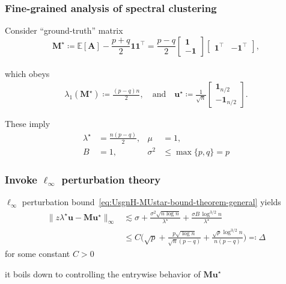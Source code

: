 \documentclass[compress,
mathserif,wide,%
]{beamer}
\begin{document}
\begin{frame}
\frametitle{Fine-grained analysis of spectral clustering}
Consider ``ground-truth'' matrix
\[
\bm{M}^{\star}\coloneqq\mathbb{E}[\bm{A}]-\frac{p+q}{2}\bm{1}\bm{1}^{\top}=\frac{p-q}{2}\left[\begin{array}{c}
\bm{1}\\
-\bm{1}
\end{array}\right]\left[\begin{array}{cc}
\bm{1}^{\top} & -\bm{1}^{\top}\end{array}\right], 
\] \\
which obeys 
\begin{align*}
	\lambda_{1}(\bm{M}^{\star})\coloneqq\frac{(p-q)n}{2},  
	\quad \text{and} \quad
	\bm{u}^{\star}  \coloneqq \frac{1}{\sqrt{n}}
	\left[\begin{array}{c}
		\bm{1}_{n/2}\\
		-\bm{1}_{n/2}
	\end{array}\right].
\end{align*}

	
These imply	\begin{align*}
\lambda^{\star} & =\tfrac{n(p-q)}{2}, & \mu & =1,\\
B & =1, & \sigma^{2} & \leq\max\{p,q\}=p
\end{align*}

\end{frame}

\begin{frame}
\frametitle{Invoke $\ell_{\infty}$ perturbation theory}
$\ell_{\infty}$ perturbation bound~\eqref{eq:UsgnH-MUstar-bound-theorem-general} yields
\begin{align*}
	\big\| z\lambda^{\star}\bm{u}-\bm{M}\bm{u}^{\star} \big\|_{\infty} & \lesssim\sigma+\frac{\sigma^{2}\sqrt{n\log n}}{\lambda^{\star}}+\frac{\sigma B\,\log^{3/2}n}{\lambda^{\star}}\nonumber \\
 	& \leq  C \Big( \sqrt{p}+\frac{p\sqrt{\log n}}{\sqrt{n}(p-q)}+\frac{\sqrt{p}\log^{3/2}n}{n(p-q)} \Big) \eqqcolon \Delta
\end{align*}
for some constant $C>0$

\vfill
{

\begin{varblock}[\textwidth]{}
\begin{center}
	it boils down to controlling the entrywise behavior of $\bm{M}\bm{u}^{\star}$
\end{center}
\end{varblock}
}

\end{frame}
\end{document}
